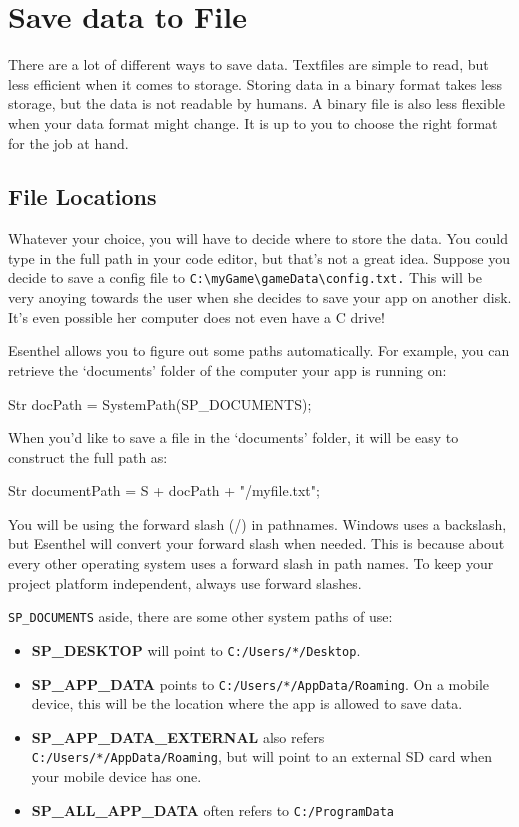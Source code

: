 \chapter{Save data to File}
There are a lot of different ways to save data. Textfiles are simple to read, but less efficient when it comes to storage. Storing data in a binary format takes less storage, but the data is not readable by humans. A binary file is also less flexible when your data format might change. It is up to you to choose the right format for the job at hand.

\section{File Locations}
Whatever your choice, you will have to decide where to store the data. You could type in the full path in your code editor, but that's not a great idea.
Suppose you decide to save a config file to \verb|C:\myGame\gameData\config.txt.| This will be very anoying towards the user when she decides to save your app on another disk. It's even possible her computer does not even have a C drive!

Esenthel allows you to figure out some paths automatically. For example, you can retrieve the `documents' folder of the computer your app is running on:

\begin{code}
Str docPath = SystemPath(SP_DOCUMENTS);
\end{code}

When you'd like to save a file in the `documents' folder, it will be easy to construct the full path as:

\begin{code}
Str documentPath = S + docPath + "/myfile.txt";
\end{code} 

\begin{note}
You will be using the forward slash (/) in pathnames. Windows uses a backslash, but Esenthel will convert your forward slash when needed. This is because about every other operating system uses a forward slash in path names. To keep your project platform independent, always use forward slashes.
\end{note}

\verb|SP_DOCUMENTS| aside, there are some other system paths of use:

\begin{itemize}
\item \textbf{SP\_DESKTOP} will point to \verb|C:/Users/*/Desktop|.
\item \textbf{SP\_APP\_DATA} points to \verb|C:/Users/*/AppData/Roaming|. On a mobile device, this will be the location where the app is allowed to save data.
\item \textbf{SP\_APP\_DATA\_EXTERNAL} also refers \verb|C:/Users/*/AppData/Roaming|, but will point to an external SD card when your mobile device has one.
\item \textbf{SP\_ALL\_APP\_DATA} often refers to \verb|C:/ProgramData|
\end{itemize}

